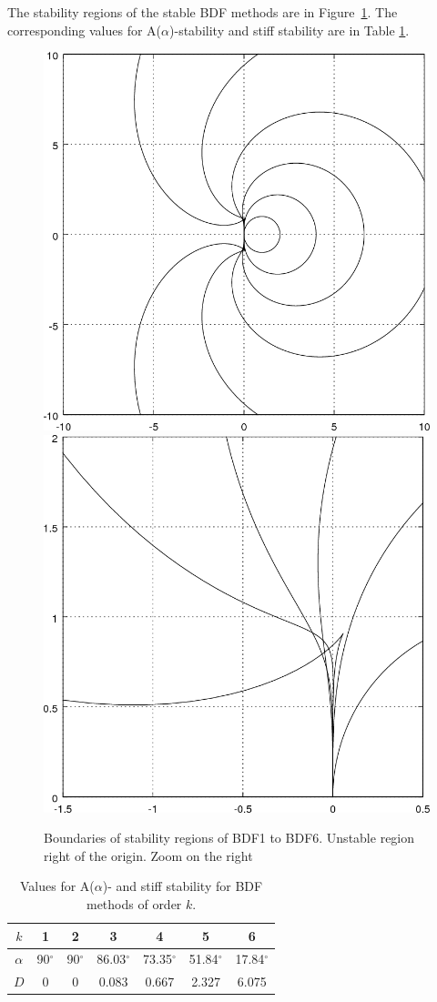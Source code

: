 \begin{example}
  The stability regions of the stable BDF methods are in
  Figure~\ref{fig:bdf-stability}. The corresponding values for
  A($\alpha$)-stability and stiff stability are in Table  
\ref{tab:bdf-stability}.
\end{example}
\begin{figure}[tp]
  \centering
  \includegraphics[width=.45\textwidth]{fig/stability-bdf.png}
  \hfill
  \includegraphics[width=.45\textwidth]{fig/stability-bdf-zoom.png}
  \caption{Boundaries of stability regions of BDF1 to BDF6. Unstable
    region right of the origin. Zoom on the right}
  \label{fig:bdf-stability}
\end{figure}
\begin{table}[tp]
  \centering
  \begin{tabular}{c|cccccc}
    $k$ & 1 & 2 & 3 & 4 & 5 & 6 \\\hline
    $\alpha$ & 90$^\circ$ & 90$^\circ$& 86.03$^\circ$
                    & 73.35$^\circ$& 51.84$^\circ$
                            & 17.84$^\circ$ \\
    $D$ & 0 & 0 & 0.083& 0.667& 2.327& 6.075
  \end{tabular}
  \caption{Values for A($\alpha$)- and stiff stability for BDF methods
    of order $k$.}
  \label{tab:bdf-stability}
\end{table}

